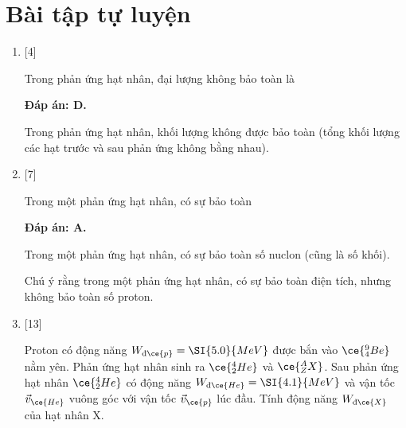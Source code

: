 \section{Bài tập tự luyện}
\begin{enumerate}[label=\bfseries Câu \arabic*:]
	\item {} [4]
	\cauhoi
	{Trong phản ứng hạt nhân, đại lượng không bảo toàn là
	}
	
	\loigiai
	{		\textbf{Đáp án: D.}
		
		Trong phản ứng hạt nhân, khối lượng không được bảo toàn (tổng khối lượng các hạt trước và sau phản ứng không bằng nhau).
		
	}
	\item {} [7]
	\cauhoi
	{Trong một phản ứng hạt nhân, có sự bảo toàn
	}
	
	\loigiai
	{		\textbf{Đáp án: A.}
		
		Trong một phản ứng hạt nhân, có sự bảo toàn số nuclon (cũng là số khối).
		
		Chú ý rằng trong một phản ứng hạt nhân, có sự bảo toàn điện tích, nhưng không bảo toàn số proton.
		
	}
	\item {} [13]
	\cauhoi
	{Proton có động năng $W_{\text{đ} \ce{p}} = \SI{5.0}{MeV}$ được bắn vào $\ce{^9_4 Be}$ nằm yên. Phản ứng hạt nhân sinh ra $\ce{^4_2 He}$ và $\ce{^A_Z X}$. Sau phản ứng hạt nhân $\ce{^4_2 He}$ có động năng $W_{\text{đ} \ce{He}} = \SI{4.1}{MeV}$ và vận tốc $\vec v_{\ce{He}}$ vuông góc với vận tốc $\vec v_{\ce{p}}$ lúc đầu. Tính động năng $W_{\text{đ} \ce{X}}$ của hạt nhân X.
	}
	

\end{enumerate}
